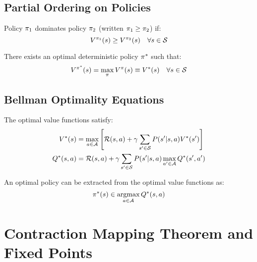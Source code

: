 \subsection{Partial Ordering on Policies}

\begin{definition}
Policy $\pi_1$ dominates policy $\pi_2$ (written $\pi_1 \geq \pi_2$) if:
\begin{equation}
V^{\pi_1}(s) \geq V^{\pi_2}(s) \quad \forall s \in \mathcal{S}
\end{equation}
\end{definition}

\begin{theorem}
There exists an optimal deterministic policy $\pi^*$ such that:
\begin{equation}
V^{\pi^*}(s) = \max_\pi V^\pi(s) \equiv V^*(s) \quad \forall s \in \mathcal{S}
\end{equation}
\end{theorem}

\subsection{Bellman Optimality Equations}

\begin{theorem}
The optimal value functions satisfy:
\begin{align}
V^*(s) &= \max_{a \in \mathcal{A}} \left[\mathcal{R}(s,a) + \gamma \sum_{s' \in \mathcal{S}} P(s'|s,a) V^*(s')\right] \\
Q^*(s,a) &= \mathcal{R}(s,a) + \gamma \sum_{s' \in \mathcal{S}} P(s'|s,a) \max_{a' \in \mathcal{A}} Q^*(s',a')
\end{align}
\end{theorem}

\begin{corollary}
An optimal policy can be extracted from the optimal value functions as:
\begin{equation}
\pi^*(s) \in \operatorname*{argmax}_{a \in \mathcal{A}} Q^*(s,a)
\end{equation}
\end{corollary}

\section{Contraction Mapping Theorem and Fixed Points}

